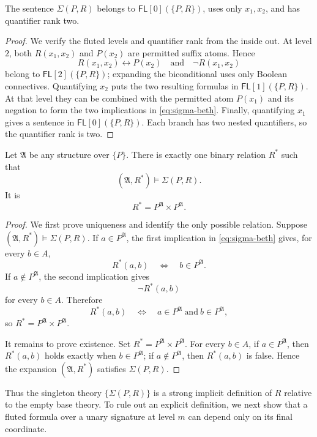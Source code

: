 \documentclass{lmcs}
\newcommand{\FL}{\mathsf{FL}}
\newcommand{\A}{\mathfrak{A}}
\begin{document}
\begin{lem}\label{lem:sigma-fluted}
The sentence $\Sigma(P,R)$ belongs to $\FL[0](\{P,R\})$, uses only
$x_1,x_2$, and has quantifier rank two.
\end{lem}

\begin{proof}
We verify the fluted levels and quantifier rank from the inside out.  At level
$2$, both
$R(x_1,x_2)$ and $P(x_2)$ are permitted suffix atoms.  Hence
\[
  R(x_1,x_2)\leftrightarrow P(x_2)
  \quad\text{and}\quad
  \neg R(x_1,x_2)
\]
belong to $\FL[2](\{P,R\})$; expanding the biconditional uses only Boolean
connectives.  Quantifying $x_2$ puts the two resulting formulas in
$\FL[1](\{P,R\})$.  At that level they can be combined with the permitted
atom $P(x_1)$ and its negation to form the two implications in
\eqref{eq:sigma-beth}.  Finally, quantifying $x_1$ gives a sentence in
$\FL[0](\{P,R\})$.  Each branch has two nested quantifiers, so the quantifier
rank is two.
\end{proof}

\begin{prop}\label{prop:unique-expansion}
Let $\A$ be any structure over $\{P\}$.  There is exactly one binary relation
$R^{\ast}$ such that
\[
  (\A,R^{\ast})\models\Sigma(P,R).
\]
It is
\[
   R^{\ast}=P^{\A}\times P^{\A}.
\]
\end{prop}

\begin{proof}
We first prove uniqueness and identify the only possible relation.  Suppose
$(\A,R^{\ast})\models\Sigma(P,R)$.  If $a\in P^{\A}$, the first implication in
\eqref{eq:sigma-beth} gives, for every $b\in A$,
\[
  R^{\ast}(a,b)\quad\Longleftrightarrow\quad b\in P^{\A}.
\]
If $a\notin P^{\A}$, the second implication gives
\[
  \neg R^{\ast}(a,b)
\]
for every $b\in A$.  Therefore
\[
  R^{\ast}(a,b)
  \quad\Longleftrightarrow\quad
  a\in P^{\A}\ \text{and}\ b\in P^{\A},
\]
so $R^{\ast}=P^{\A}\times P^{\A}$.

It remains to prove existence.  Set $R^{\ast}=P^{\A}\times P^{\A}$.  For
every $b\in A$, if $a\in P^{\A}$, then
$R^{\ast}(a,b)$ holds exactly when $b\in P^{\A}$; if
$a\notin P^{\A}$, then $R^{\ast}(a,b)$ is false.  Hence the expansion
$(\A,R^{\ast})$ satisfies $\Sigma(P,R)$.
\end{proof}

Thus the singleton theory $\{\Sigma(P,R)\}$ is a strong implicit definition
of $R$ relative to the empty base theory.  To rule out an explicit definition,
we next show that a fluted formula over a unary signature at level $m$ can
depend only on its final coordinate.
\end{document}
